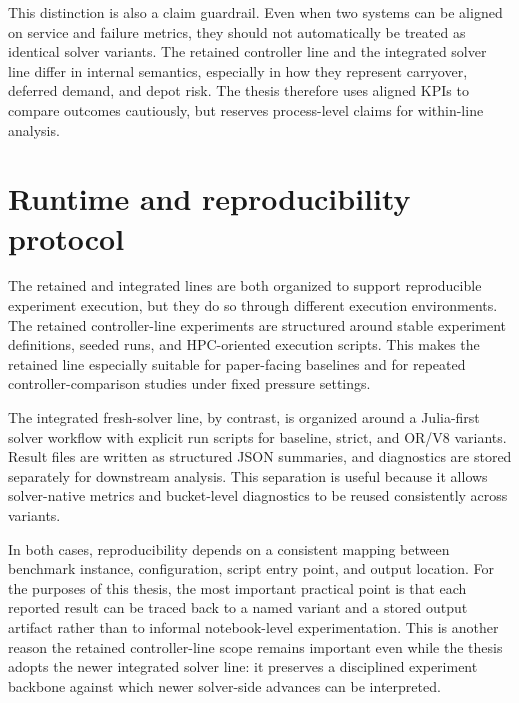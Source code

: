 This distinction is also a claim guardrail. Even when two systems can be aligned on service and failure metrics, they should not automatically be treated as identical solver variants. The retained controller line and the integrated solver line differ in internal semantics, especially in how they represent carryover, deferred demand, and depot risk. The thesis therefore uses aligned KPIs to compare outcomes cautiously, but reserves process-level claims for within-line analysis.

\section{Runtime and reproducibility protocol}

The retained and integrated lines are both organized to support reproducible experiment execution, but they do so through different execution environments. The retained controller-line experiments are structured around stable experiment definitions, seeded runs, and HPC-oriented execution scripts. This makes the retained line especially suitable for paper-facing baselines and for repeated controller-comparison studies under fixed pressure settings.

The integrated fresh-solver line, by contrast, is organized around a Julia-first solver workflow with explicit run scripts for baseline, strict, and OR/V8 variants. Result files are written as structured JSON summaries, and diagnostics are stored separately for downstream analysis. This separation is useful because it allows solver-native metrics and bucket-level diagnostics to be reused consistently across variants.

In both cases, reproducibility depends on a consistent mapping between benchmark instance, configuration, script entry point, and output location. For the purposes of this thesis, the most important practical point is that each reported result can be traced back to a named variant and a stored output artifact rather than to informal notebook-level experimentation. This is another reason the retained controller-line scope remains important even while the thesis adopts the newer integrated solver line: it preserves a disciplined experiment backbone against which newer solver-side advances can be interpreted.

